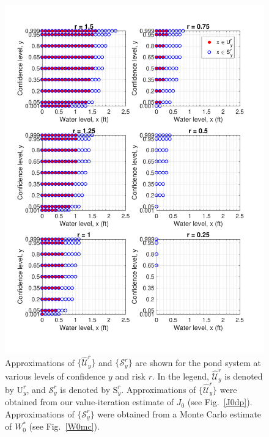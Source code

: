 \documentclass[letterpaper, 10 pt, conference]{ieeeconf}  %
\begin{document}
\begin{figure}[thpb]
\vspace{-.6cm}
      \centering
      \includegraphics[scale=0.45]{output_CompareScript_Sept252018.pdf}
      \vspace{-2em}
      \caption{ Approximations of $\{\widehat{\mathcal{U}}_y^r\}$ and $\{\mathcal{S}_y^r\}$ are shown for the pond system at various levels of confidence $y$ and risk $r$. In the legend,  $\widehat{\mathcal{U}}_y^r$ is denoted by $\text{U}_y^r$, and $\mathcal{S}_y^r$ is denoted by $\text{S}_y^r$. Approximations of $\{\widehat{\mathcal{U}}_y^r\}$ were obtained from our value-iteration estimate of $J_0$ (see Fig.~\ref{J0dp}). Approximations of $\{\mathcal{S}_y^r\}$ were obtained from a Monte Carlo estimate of $W_0^*$ (see Fig.~\ref{W0mc}).}\label{compare}
\end{figure}
\end{document}
